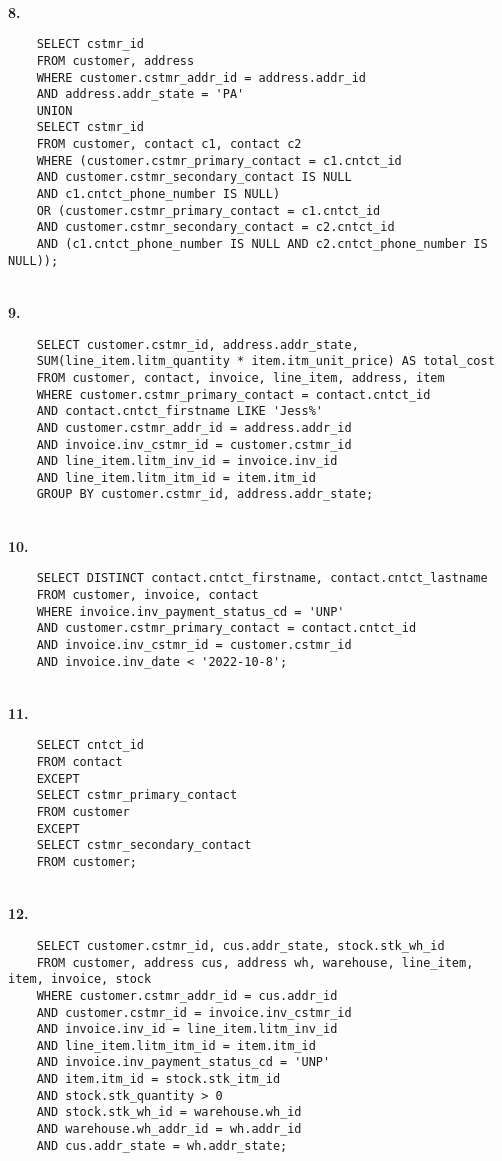 \documentclass[letterpaper,11pt]{article}
\newcommand{\Paragraph}[1]{~\vspace*{-0.7\baselineskip}\\{\bf #1}}
\begin{document}
\Paragraph{8.}
\begin{verbatim}
	SELECT cstmr_id
	FROM customer, address
	WHERE customer.cstmr_addr_id = address.addr_id
	AND address.addr_state = 'PA'
	UNION
	SELECT cstmr_id
	FROM customer, contact c1, contact c2
	WHERE (customer.cstmr_primary_contact = c1.cntct_id
	AND customer.cstmr_secondary_contact IS NULL 
	AND c1.cntct_phone_number IS NULL)
	OR (customer.cstmr_primary_contact = c1.cntct_id
	AND customer.cstmr_secondary_contact = c2.cntct_id
	AND (c1.cntct_phone_number IS NULL AND c2.cntct_phone_number IS NULL));

\end{verbatim}

\newpage
\Paragraph{9.}
\begin{verbatim}
	SELECT customer.cstmr_id, address.addr_state, 
	SUM(line_item.litm_quantity * item.itm_unit_price) AS total_cost
	FROM customer, contact, invoice, line_item, address, item
	WHERE customer.cstmr_primary_contact = contact.cntct_id
	AND contact.cntct_firstname LIKE 'Jess%' 
	AND customer.cstmr_addr_id = address.addr_id
	AND invoice.inv_cstmr_id = customer.cstmr_id
	AND line_item.litm_inv_id = invoice.inv_id
	AND line_item.litm_itm_id = item.itm_id
	GROUP BY customer.cstmr_id, address.addr_state;
\end{verbatim}


\Paragraph{10. }
\begin{verbatim}
	SELECT DISTINCT contact.cntct_firstname, contact.cntct_lastname
	FROM customer, invoice, contact
	WHERE invoice.inv_payment_status_cd = 'UNP' 
	AND customer.cstmr_primary_contact = contact.cntct_id
	AND invoice.inv_cstmr_id = customer.cstmr_id
	AND invoice.inv_date < '2022-10-8';
\end{verbatim}

\Paragraph{11.}
\begin{verbatim}
	SELECT cntct_id
	FROM contact
	EXCEPT
	SELECT cstmr_primary_contact
	FROM customer
	EXCEPT
	SELECT cstmr_secondary_contact
	FROM customer;

\end{verbatim}

\newpage
\Paragraph{12. }
\begin{verbatim}
	SELECT customer.cstmr_id, cus.addr_state, stock.stk_wh_id
	FROM customer, address cus, address wh, warehouse, line_item, item, invoice, stock
	WHERE customer.cstmr_addr_id = cus.addr_id
	AND customer.cstmr_id = invoice.inv_cstmr_id
	AND invoice.inv_id = line_item.litm_inv_id
	AND line_item.litm_itm_id = item.itm_id
	AND invoice.inv_payment_status_cd = 'UNP'
	AND item.itm_id = stock.stk_itm_id
	AND stock.stk_quantity > 0
	AND stock.stk_wh_id = warehouse.wh_id
	AND warehouse.wh_addr_id = wh.addr_id
	AND cus.addr_state = wh.addr_state;

\end{verbatim}
\end{document}
